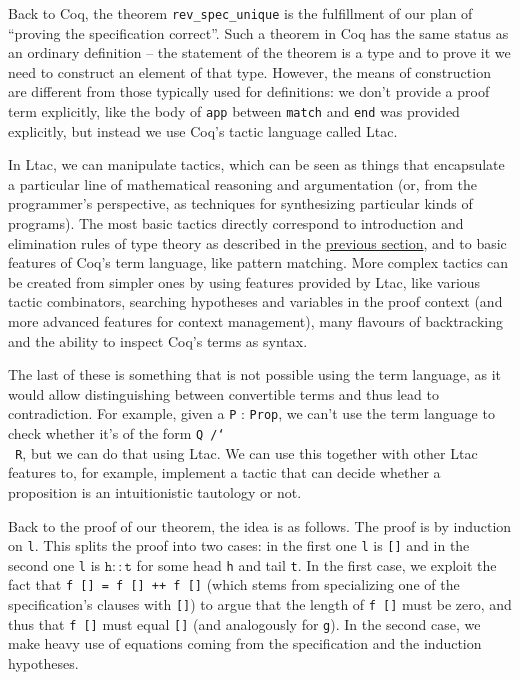 \documentclass[declaration,mgr,english,shortabstract]{iithesis}
\newcommand{\m}[1]{\texttt{#1}}
\begin{document}
Back to Coq, the theorem \m{rev\_spec\_unique} is the fulfillment of our plan of ``proving the specification correct''. Such a theorem in Coq has the same status as an ordinary definition -- the statement of the theorem is a type and to prove it we need to construct an element of that type. However, the means of construction are different from those typically used for definitions: we don't provide a proof term explicitly, like the body of \m{app} between \m{match} and \m{end} was provided explicitly, but instead we use Coq's tactic language called Ltac.

In Ltac, we can manipulate tactics, which can be seen as things that encapsulate a particular line of mathematical reasoning and argumentation (or, from the programmer's perspective, as techniques for synthesizing particular kinds of programs). The most basic tactics directly correspond to introduction and elimination rules of type theory as described in the \hyperref[mltt]{previous section}, and to basic features of Coq's term language, like pattern matching. More complex tactics can be created from simpler ones by using features provided by Ltac, like various tactic combinators, searching hypotheses and variables in the proof context (and more advanced features for context management), many flavours of backtracking and the ability to inspect Coq's terms as syntax.

The last of these is something that is not possible using the term language, as it would allow distinguishing between convertible terms and thus lead to contradiction. For example, given a \m{P} : \m{Prop}, we can't use the term language to check whether it's of the form \m{Q /\char`\\\ R}, but we can do that using Ltac. We can use this together with other Ltac features to, for example, implement a tactic that can decide whether a proposition is an intuitionistic tautology or not.

Back to the proof of our theorem, the idea is as follows. The proof is by induction on \m{l}. This splits the proof into two cases: in the first one \m{l} is \m{[]} and in the second one \m{l} is $\m{h} :: \m{t}$ for some head \m{h} and tail \m{t}. In the first case, we exploit the fact that \m{f [] = f [] ++ f []} (which stems from specializing one of the specification's clauses with \m{[]}) to argue that the length of \m{f []} must be zero, and thus that \m{f []} must equal \m{[]} (and analogously for \m{g}). In the second case, we make heavy use of equations coming from the specification and the induction hypotheses.
\end{document}
